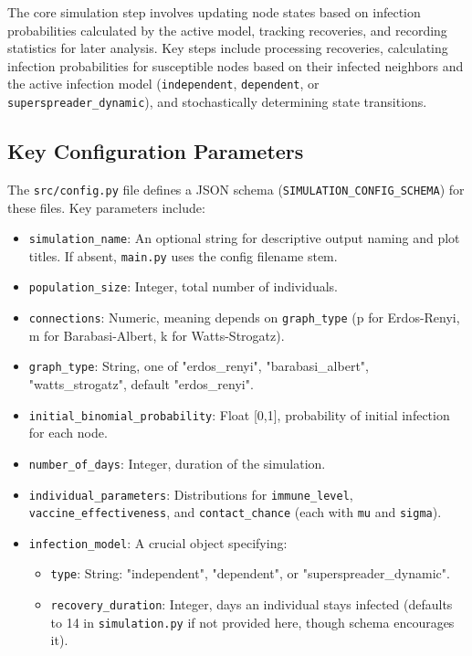 \documentclass[12pt]{article}
\begin{document}
The core simulation step involves updating node states based on infection probabilities calculated by the active model, tracking recoveries, and recording statistics for later analysis. Key steps include processing recoveries, calculating infection probabilities for susceptible nodes based on their infected neighbors and the active infection model (\texttt{independent}, \texttt{dependent}, or \texttt{super\-spreader\_dynamic}), and stochastically determining state transitions.

\subsection{Key Configuration Parameters}
The \texttt{src/config.py} file defines a JSON schema (\texttt{SIMULATION\_CONFIG\_SCHEMA}) for these files. Key parameters include:
\begin{itemize}
    \item \texttt{simulation\_name}: An optional string for descriptive output naming and plot titles. If absent, \texttt{main.py} uses the config filename stem.
    \item \texttt{population\_size}: Integer, total number of individuals.
    \item \texttt{connections}: Numeric, meaning depends on \texttt{graph\_type} (p for Erdos-Renyi, m for Barabasi-Albert, k for Watts-Strogatz).
    \item \texttt{graph\_type}: String, one of "erdos\_renyi", "barabasi\_albert", "watts\_strogatz", default "erdos\_renyi".
    \item \texttt{initial\_binomial\_probability}: Float [0,1], probability of initial infection for each node.
    \item \texttt{number\_of\_days}: Integer, duration of the simulation.
    \item \texttt{individual\_parameters}: Distributions for \texttt{immune\_level}, \texttt{vaccine\_ef\-fec\-tive\-ness}, and \texttt{contact\_chance} (each with \texttt{mu} and \texttt{sigma}).
    \item \texttt{infection\_model}: A crucial object specifying:
    \begin{itemize}
      \item \texttt{type}: String: "independent", "dependent", or "super\-spreader\_dy\-namic".
      \item \texttt{recovery\_duration}: Integer, days an individual stays infected (defaults to 14 in \texttt{simulation.py} if not provided here, though schema encourages it).

\end{itemize}
\end{itemize}
\end{document}
